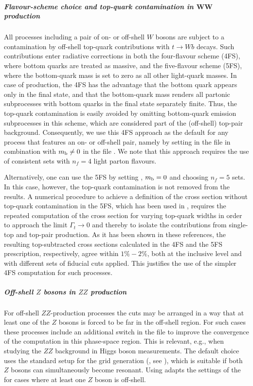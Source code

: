 \documentclass[english,11pt]{article}
\begin{document}
\subparagraph{Flavour-scheme choice and top-quark contamination in $\boldsymbol{WW}$ production}\label{sec:topcontamination}\quad

All processes including a pair of on- or off-shell $W$ bosons are subject to a contamination by off-shell 
top-quark contributions with $t\rightarrow Wb$ decays. Such contributions enter radiative corrections in both 
the four-flavour scheme (4FS), where bottom quarks are treated as massive, and the five-flavour scheme (5FS), 
where the bottom-quark mass is set to zero as all other light-quark masses. In case of \ww{} production, the 4FS has 
the advantage that the bottom quark appears only in the final state, and that the bottom-quark mass renders all
partonic subprocesses with bottom quarks in the final state separately finite.
Thus, the top-quark contamination is easily avoided by omitting bottom-quark emission subprocesses in this scheme, 
which are considered part of the (off-shell) top-pair background.
Consequently, we use this 4FS approach
as the default for any process that features 
an on- or off-shell \ww{} pair, namely by setting  in the file  
in combination with $m_{\rm b}\neq 0$ in the file . We note that 
this approach requires the use of consistent \pdf{} sets with $n_f=4$ light parton flavours.

Alternatively, one can use the 5FS by setting , $m_{\rm b}=0$ and choosing $n_f=5$ \pdf{} sets. In this case, however, 
the top-quark contamination is not removed from the results. A numerical procedure to achieve a definition of the \ww{} 
cross section without top-quark contamination in the 5FS, which has been used in , requires the 
repeated computation of the cross section for varying top-quark widths in order
to approach the limit $\Gamma_{t}\to0$ and thereby to isolate the contributions from single-top and top-pair production. 
As it has been shown in these 
references, the resulting top-subtracted \ww{} cross sections calculated in the 4FS and the 5FS prescription, respectively, agree within $1\%-2\%$, both at the inclusive level 
and with different sets of fiducial cuts applied. This justifies the use of the simpler 4FS computation for such processes.

\subparagraph{Off-shell $Z$ bosons in $ZZ$ production}\label{sec:offshell}\quad

For off-shell $ZZ$-production processes the cuts may be arranged in a way that
at least one of the $Z$ bosons is forced to be far in the off-shell region. For such 
cases these processes include an additional switch  in the file  to improve 
the convergence of the computation in this phase-space region. This
is relevant, e.g., when studying the $ZZ$ background in Higgs boson measurements. 
The default choice 
uses the standard setup for the grid generation (\gridrun{}, see ), which 
is suitable if both $Z$ bosons can simultaneously become resonant. Using 
adapts the settings of the \gridrun{} for cases where at least one $Z$ boson is off-shell.
\end{document}
